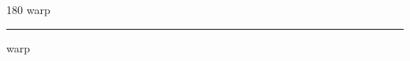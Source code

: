 
\begin{frame}
\begin{center}
\begin{turn}{180}
{\fontsize{2.5cm}{1em}\selectfont warp}
\end{turn}
\vspace{1em}\par  
\hrule
\vspace{1em}\par  
{\fontsize{2.5cm}{1em}\selectfont warp}
\end{center}
\end{frame}
